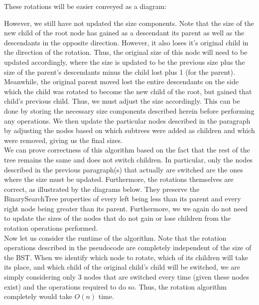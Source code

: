 \documentclass[11pt]{article}
\begin{document}
\begin{enumerate}
\begin{enumerate}
\begin{enumerate}
            These rotations will be easier conveyed as a diagram:
            
            However, we still have not updated the size components. Note that the size of the new child of the root node has gained as a descendant its parent as well as the descendants in the opposite direction. However, it also loses it's original child in the direction of the rotation. Thus, the original size of this node will need to be updated accordingly, where the size is updated to be the previous size plus the size of the parent's descendants minus the child lost plus 1 (for the parent). \\
            
            Meanwhile, the original parent moved lost the entire descendants on the side which the child was rotated to become the new child of the root, but gained that child's previous child. Thus, we must adjust the size accordingly. This can be done by storing the necessary size components described herein before performing any operations. We then update the particular nodes described in the paragraph by adjusting the nodes based on which subtrees were added as children and which were removed, giving us the final sizes. \\ 
            
            We can prove correctness of this algorithm based on the fact that the rest of the tree remains the same and does not switch children. In particular, only the nodes described in the previous paragraph(s) that actually are switched are the ones where the size must be updated. Furthermore, the rotations themselves are correct, as illustrated by the diagrams below. They preserve the BinarySearchTree properties of every left being less than its parent and every right node being greater than its parent. Furthermore, we we again do not need to update the sizes of the nodes that do not gain or lose children from the rotation operations performed. \\
            
            Now let us consider the runtime of the algorithm. Note that the rotation operations described in the pseudocode are completely independent of the size of the BST. When we identify which node to rotate, which of its children will take its place, and which child of the original child's child will be switched, we are simply considering only 3 nodes that are switched every time (given these nodes exist) and the operations required to do so. Thus, the rotation algorithm completely would take $O(n)$ time. 
            

\end{enumerate}
\end{enumerate}
\end{enumerate}
\end{document}
